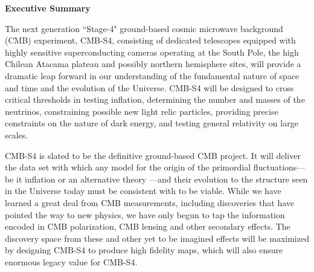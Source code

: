 \begin{center}
  {\Large \bf Executive Summary}
\end{center}

The next generation ``Stage-4" ground-based cosmic microwave background (CMB) experiment, CMB-S4, consisting of dedicated telescopes equipped with highly sensitive superconducting cameras operating at the South Pole, the high Chilean Atacama plateau and possibly northern hemisphere sites, will provide a dramatic leap forward in our understanding of the fundamental nature of space and time and the evolution of the Universe. CMB-S4 will be designed to cross critical thresholds in testing inflation, determining the number and masses of the neutrinos, constraining possible new light relic particles, providing precise constraints on the nature of dark energy, and testing general relativity on large scales. 

CMB-S4 is slated to be the definitive ground-based CMB project. It will deliver the data set with which any model for the origin of the primordial fluctuations--- be it inflation or an alternative theory ---and their evolution to the structure seen in the Universe today must be consistent with to be viable.  While we have learned a great deal from CMB measurements, including discoveries that have pointed the way to new physics, we have only begun to tap the information encoded in CMB polarization, CMB lensing and other secondary effects.  The discovery space from these and other yet to be imagined effects will be  maximized by designing CMB-S4 to produce high fidelity maps, which will also ensure enormous legacy value for CMB-S4.


